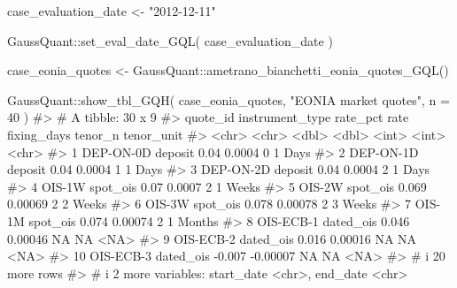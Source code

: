 \documentclass[
  letterpaper,
  DIV=11,
  numbers=noendperiod]{scrreprt}
\newenvironment{Shaded}{\begin{snugshade}}{\end{snugshade}}
\newcommand{\AttributeTok}[1]{\textcolor[rgb]{0.40,0.45,0.13}{#1}}
\newcommand{\CommentTok}[1]{\textcolor[rgb]{0.37,0.37,0.37}{#1}}
\newcommand{\DecValTok}[1]{\textcolor[rgb]{0.68,0.00,0.00}{#1}}
\newcommand{\FunctionTok}[1]{\textcolor[rgb]{0.28,0.35,0.67}{#1}}
\newcommand{\NormalTok}[1]{\textcolor[rgb]{0.00,0.23,0.31}{#1}}
\newcommand{\OtherTok}[1]{\textcolor[rgb]{0.00,0.23,0.31}{#1}}
\newcommand{\SpecialCharTok}[1]{\textcolor[rgb]{0.37,0.37,0.37}{#1}}
\newcommand{\StringTok}[1]{\textcolor[rgb]{0.13,0.47,0.30}{#1}}
\begin{document}
\begin{Shaded}
\begin{Highlighting}[]
\NormalTok{case\_evaluation\_date }\OtherTok{\textless{}{-}} \StringTok{"2012{-}12{-}11"}

\NormalTok{GaussQuant}\SpecialCharTok{::}\FunctionTok{set\_eval\_date\_GQL}\NormalTok{(}
\NormalTok{  case\_evaluation\_date}
\NormalTok{)}

\NormalTok{case\_eonia\_quotes }\OtherTok{\textless{}{-}}\NormalTok{ GaussQuant}\SpecialCharTok{::}\FunctionTok{ametrano\_bianchetti\_eonia\_quotes\_GQL}\NormalTok{()}

\NormalTok{GaussQuant}\SpecialCharTok{::}\FunctionTok{show\_tbl\_GQH}\NormalTok{(}
\NormalTok{  case\_eonia\_quotes,}
  \StringTok{"EONIA market quotes"}\NormalTok{,}
  \AttributeTok{n =} \DecValTok{40}
\NormalTok{)}
\CommentTok{\#\textgreater{} \# A tibble: 30 x 9}
\CommentTok{\#\textgreater{}    quote\_id  instrument\_type rate\_pct     rate fixing\_days tenor\_n tenor\_unit}
\CommentTok{\#\textgreater{}    \textless{}chr\textgreater{}     \textless{}chr\textgreater{}              \textless{}dbl\textgreater{}    \textless{}dbl\textgreater{}       \textless{}int\textgreater{}   \textless{}int\textgreater{} \textless{}chr\textgreater{}     }
\CommentTok{\#\textgreater{}  1 DEP{-}ON{-}0D deposit            0.04   0.0004            0       1 Days      }
\CommentTok{\#\textgreater{}  2 DEP{-}ON{-}1D deposit            0.04   0.0004            1       1 Days      }
\CommentTok{\#\textgreater{}  3 DEP{-}ON{-}2D deposit            0.04   0.0004            2       1 Days      }
\CommentTok{\#\textgreater{}  4 OIS{-}1W    spot\_ois           0.07   0.0007            2       1 Weeks     }
\CommentTok{\#\textgreater{}  5 OIS{-}2W    spot\_ois           0.069  0.00069           2       2 Weeks     }
\CommentTok{\#\textgreater{}  6 OIS{-}3W    spot\_ois           0.078  0.00078           2       3 Weeks     }
\CommentTok{\#\textgreater{}  7 OIS{-}1M    spot\_ois           0.074  0.00074           2       1 Months    }
\CommentTok{\#\textgreater{}  8 OIS{-}ECB{-}1 dated\_ois          0.046  0.00046          NA      NA \textless{}NA\textgreater{}      }
\CommentTok{\#\textgreater{}  9 OIS{-}ECB{-}2 dated\_ois          0.016  0.00016          NA      NA \textless{}NA\textgreater{}      }
\CommentTok{\#\textgreater{} 10 OIS{-}ECB{-}3 dated\_ois         {-}0.007 {-}0.00007          NA      NA \textless{}NA\textgreater{}      }
\CommentTok{\#\textgreater{} \# i 20 more rows}
\CommentTok{\#\textgreater{} \# i 2 more variables: start\_date \textless{}chr\textgreater{}, end\_date \textless{}chr\textgreater{}}
\end{Highlighting}
\end{Shaded}
\end{document}
